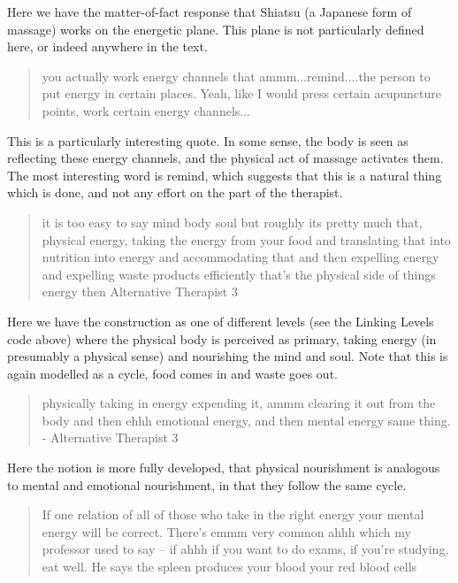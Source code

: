 Here we have the matter-of-fact response that Shiatsu (a Japanese form of massage) works on the energetic plane. This plane is not particularly defined here, or indeed anywhere in the text. 


\begin{quotation}
   you actually work energy channels that ammm...remind....the person to put energy in certain places. Yeah, like I would press certain acupuncture points, work certain energy channels...

\end{quotation}

This is a particularly interesting quote. In some sense, the body is seen as reflecting these energy channels, and the physical act of massage activates them. The most interesting word is remind, which suggests that this is a natural thing which is done, and not any effort on the part of the therapist. 

\begin{quotation}
  it is too easy to say mind body soul but roughly its pretty much that, physical energy, taking the energy from your food and translating that into nutrition into energy and accommodating that and then expelling energy and expelling waste products efficiently that's the physical side of things energy then 
Alternative Therapist 3
\end{quotation}

Here we have the construction as one of different levels (see the Linking Levels code above) where the physical body is perceived as primary, taking energy (in presumably a physical sense) and nourishing the mind and soul. Note that this is again modelled as a cycle, food comes in and waste goes out. 

\begin{quotation}
  physically taking in energy expending it, ammm clearing it out from the body and then ehhh emotional energy, and then mental energy same thing.
- Alternative Therapist 3
\end{quotation}

Here the notion is more fully developed, that physical nourishment is analogous to mental and emotional nourishment, in that they follow the same cycle. 


\begin{quotation}
  If one relation of all of those who take in the right energy your mental energy will be correct. There's emmm very common ahhh which my professor used to say – if ahhh if you want to do exams, if you're studying, eat well. He says the spleen produces your blood your red blood cells 

\end{quotation}

